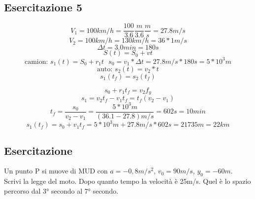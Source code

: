\documentclass{book}
\begin{document}
\subsection{Esercitazione 5}
	\begin{equation*}
		V_1=100km/h=\frac{100}{3.6}\frac{m}{3.6}\frac{m}{s}=27.8m/s
	\end{equation*}
	\begin{equation*}
		V_2=100km/h=130km/h=36*1m/s
	\end{equation*}
	\begin{equation*}
		\Delta t=3.0min=180s
	\end{equation*}
	\begin{equation*}
		S(t)=S_0+vt
	\end{equation*}
	\begin{equation*}
		\text{camion: } s_1(t)=S_0+r_1t \text{ } s_0=v_1*\Delta
		t=27.8m/s*180s=5*10^3m
	\end{equation*}
	\begin{equation*}
		\text{auto: } s_2(t)=v_2*t
	\end{equation*}
	\begin{equation*}
		s_1(t_f)=s_2(t_f)
	\end{equation*}
\begin{multicols}{2}
	\begin{equation*}
		s_0+r_1t_f=v_2f_y
	\end{equation*}
	\begin{equation*}
		s_1=v_2t_f-v_1t_f=t_f(v_2-v_1)
	\end{equation*}
	\begin{equation*}
		\boxed{t_f=\frac{s_0}{v_2-v_1}}=\frac{5*10^3m}{(36.1-27.8)m/s}=602s=10min
	\end{equation*}
	\begin{equation*}
		s_1(t_f)=s_0+v_1t_f=5*10^3m+27.8m/s*602s=21735m=22km
	\end{equation*}

\end{multicols}
\subsection{Esercitazione}
Un punto P si muove di MUD con $a=-0,8m/s^2$, $v_0=90m/s$, $y_0=-60m$. Scrivi
la legge del moto. Dopo quanto tempo la velocità è 25m/s. Quel è lo spazio
percorso dal 3° secondo al 7° secondo.
\end{document}
